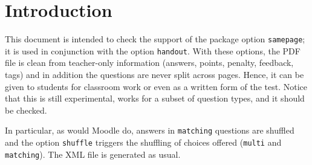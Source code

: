 \documentclass{article}
\begin{document}
\section*{Introduction}

This document is intended to check the support of the package option
\texttt{samepage}; it is used in conjunction with the option \texttt{handout}.
With these options, the PDF file is clean from teacher-only
information (answers, points, penalty, feedback, tags) and in addition
the questions are never split across pages.  Hence, it can be given
to students for classroom work or even as a written form of the test.
Notice that this is still experimental, works for a subset of question types,
and it should be checked.

In particular, as would Moodle do, answers in \texttt{matching} questions are 
shuffled and the option \texttt{shuffle} triggers the shuffling of choices 
offered (\texttt{multi} and \texttt{matching}). The XML file is generated as 
usual.
\end{document}

